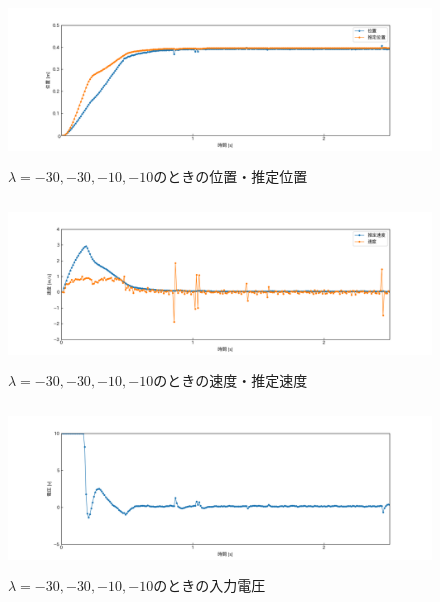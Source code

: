 \documentclass[12pt]{jsarticle}
\begin{document}
\begin{figure}[H]
  \begin{center}
    \includegraphics[clip,width=13.0cm, height=4.4cm]{../img/Exp2-1.png}
    \caption{$\lambda=-30, -30, -10, -10$のときの位置・推定位置}
    \label{Exp2-1}
  \end{center}
\end{figure}
\begin{figure}[H]
  \begin{center}
    \includegraphics[clip,width=13.0cm, height=4.4cm]{../img/Exp2-2.png}
    \caption{$\lambda=-30, -30, -10, -10$のときの速度・推定速度}
    \label{Exp2-2}
  \end{center}
\end{figure}
\begin{figure}[H]
  \begin{center}
    \includegraphics[clip,width=13.0cm, height=4.4cm]{../img/Exp2-3.png}
    \caption{$\lambda=-30, -30, -10, -10$のときの入力電圧}
    \label{Exp2-3}
  \end{center}
\end{figure}
\end{document}

